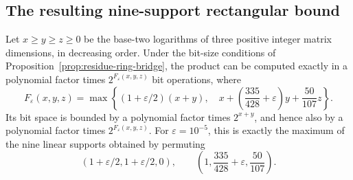 \subsection{The resulting nine-support rectangular bound}

\begin{theorem}
\label{thm:updated-rectangle}
Let $x\geq y\geq z\geq0$ be the base-two logarithms of three positive
integer matrix dimensions, in decreasing order. Under the bit-size
conditions of Proposition~\ref{prop:residue-ring-bridge}, the product can
be computed exactly in a polynomial factor times $2^{F_\varepsilon(x,y,z)}$
bit operations, where
\[
 F_\varepsilon(x,y,z)=
 \max\left\{
 (1+\varepsilon/2)(x+y),\quad
 x+\left(\frac{335}{428}+\varepsilon\right)y+
       \frac{50}{107}z
 \right\}.
\]
Its bit space is bounded by a polynomial factor times $2^{x+y}$,
and hence also by a polynomial factor times $2^{F_\varepsilon(x,y,z)}$.
For $\varepsilon=10^{-5}$, this is exactly the maximum of the nine linear
supports obtained by permuting
\[
 (1+\varepsilon/2,1+\varepsilon/2,0),\qquad
 \left(1,\frac{335}{428}+\varepsilon,\frac{50}{107}\right).
\]
\end{theorem}

